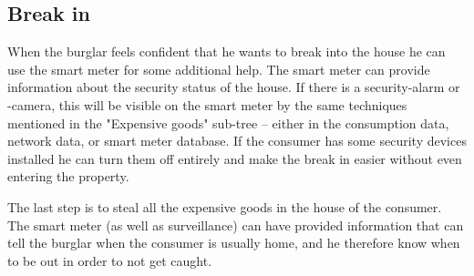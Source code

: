 \subsection{Break in}
When the burglar feels confident that he wants to break into the house he can use the smart meter for some additional help.
The smart meter can provide information about the security status of the house.
If there is a security-alarm or -camera, this will be visible on the smart meter by the same techniques mentioned in the "Expensive goods" sub-tree -- either in the consumption data, network data, or smart meter database.
If the consumer has some security devices installed he can turn them off entirely and make the break in easier without even entering the property.

The last step is to steal all the expensive goods in the house of the consumer.
The smart meter (as well as surveillance) can have provided information that can tell the burglar when the consumer is usually home, and he therefore know when to be out in order to not get caught.
